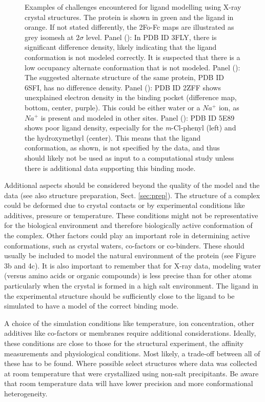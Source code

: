 \documentclass[9pt,bestpractices]{livecoms}
\begin{document}
\begin{figure}
    \caption{Examples of challenges encountered for ligand modelling using X-ray crystal structures. The protein is shown in green and the ligand in orange. If not stated differently, the 2Fo-Fc maps are illustrated as grey isomesh at $2\sigma$ level. 
    Panel (): In PDB ID 3FLY, there is significant difference density, likely indicating that the ligand conformation is not modeled correctly.  It is suspected that there is a low occupancy alternate conformation that is not modeled.
    Panel (): The suggested alternate structure of the same protein, PDB ID 6SFI, has no difference density.
    Panel (): PDB ID 2ZFF shows unexplained electron density in the binding pocket (difference map, bottom, center, purple). This could
    be either water or a $Na^+$ ion, as $Na^+$ is present and modeled in other sites. 
    Panel (): PDB ID 5E89 shows poor ligand density, especially for the \textit{m}-Cl-phenyl (left) and the hydroxymethyl (center). This means that the ligand conformation, as shown, is not specified by the data, and thus should likely not be used as input to a computational study unless there is additional data supporting this binding mode.
    }
    \label{fig:crystal2}
\end{figure}

Additional aspects should be considered beyond the quality of the model and the data (see also structure preparation, Sect. \ref{sec:prep}).
%
The structure of a complex could be deformed due to crystal contacts
or by experimental conditions like additives, pressure or temperature. These conditions might not be representative for the biological environment and therefore biologically active conformation of the complex. 
%
Other factors could play an important role in determining  active conformations, such as crystal waters, co-factors or co-binders. These should usually be included to model the natural environment of the protein (see Figure 3b and 4c). It is also important to remember that for X-ray data, modeling water (versus amino acids or organic compounds) is less precise than for other atoms particularly when the crystal is formed in a high salt environment.
%
The ligand in the experimental structure should be sufficiently close to the ligand to be simulated to have a model of the correct binding mode. 

A choice of the simulation conditions like temperature, ion concentration, other additives like co-factors or membranes require additional considerations. Ideally, these conditions are close to those for the structural experiment, the affinity measurements and physiological conditions. Most likely, a trade-off between all of these has to be found. Where possible select structures where data was collected at room temperature that were crystallized using non-salt precipitants. Be aware that room temperature data will have lower precision and more conformational heterogeneity.
    
\end{document}
